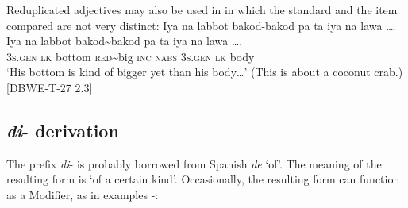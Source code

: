 \hspace*{-4.9pt}Reduplicated adjectives may also be used in  in which the standard and the item compared are not very distinct:
\ea
\label{bkm:Ref117581975}
Iya  na  labbot  bakod-bakod  pa  ta  iya  na  lawa …. \\\smallskip
 \gll Iya  na  labbot  bakod\sim{}bakod  pa  ta  iya  na  lawa …. \\
3\textsc{s.gen}  \textsc{lk}  bottom  \textsc{red}\sim{}big  \textsc{inc}  \textsc{nabs}  3\textsc{s.gen}  \textsc{lk}  body \\
\glt ‘His bottom is kind of bigger yet than his body…’ (This is about a coconut crab.) [DBWE-T-27 2.3]
\z

\subsection{\textit{di}{}- derivation}
\label{di-derivation}

The prefix \textit{di}{}- is probably borrowed from Spanish \textit{de} ‘of’. The meaning of the resulting form is ‘of a certain kind’. Occasionally, the resulting form can function as a Modifier, as in examples -:


